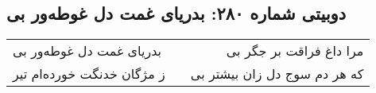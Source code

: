 \begin{center}
\section*{دوبیتی شماره ۲۸۰: بدریای غمت دل غوطه‌ور بی}
\label{sec:280}
\begin{longtable}{l p{0.5cm} r}
بدریای غمت دل غوطه‌ور بی
&&
مرا داغ فراقت بر جگر بی
\\
ز مژگان خدنگت خورده‌ام تیر
&&
که هر دم سوج دل زان بیشتر بی
\\
\end{longtable}
\end{center}

